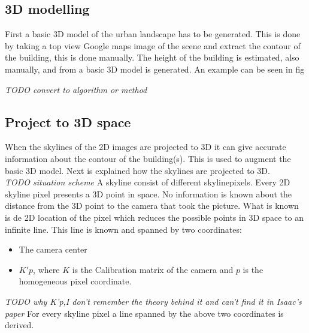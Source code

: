 \documentclass[10pt]{article}
\begin{document}
   \subsection{3D modelling}
First a basic 3D model of the urban landscape has to be generated. This is done
by taking a top view Google maps image of the scene and extract the contour of
the building, this is done manually. 
The height of the building is estimated, also manually, and from a basic 3D model is
generated. 
An example can be seen in fig



\textit{TODO convert to algorithm or method }
\subsection{Project to 3D space}
When the skylines of the 2D images are projected to 3D it can give 
accurate information about the contour of the building(s). This is used to
augment the basic 3D model.  Next is explained how the skylines are projected to
3D.\\

\textit{TODO situation scheme}
A skyline consist of different skylinepixels. Every 2D skyline pixel presents a 3D point in space. No
information is known about the distance from the 3D point to the camera that
took the picture. What is known is de 2D location of the pixel which reduces the possible points in 3D
space to an infinite line.  This line is known and spanned by two 
coordinates:\\ 
\begin{itemize}
	\item The camera center %
	\item $K'p$, where $K$ is the Calibration matrix of the camera and $p$ is the homogeneous pixel coordinate.
\end{itemize}

\textit{ TODO why K'p,I don't remember the theory behind it and can't find it in Isaac's paper }
For every skyline pixel a line spanned by the above two coordinates is derived.

\end{document}
